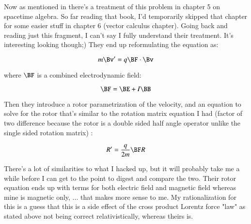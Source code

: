 Now as mentioned in \cite{doran2003gap}
there's a treatment of this problem 
in chapter 5 on spacetime algebra.  So far reading that book, I'd temporarily skipped that chapter for some easier stuff in chapter 6 (vector calculus chapter).  Going back and reading just this fragment, I can't say I fully understand their treatment.  It's interesting looking though;)  They end up reformulating the equation as:

\[
m \Bv' = q \BF \cdot \Bv
\]

where $\BF$ is a combined electrodynamic field:

\[
\BF = \BE + I \BB
\]

Then they introduce a rotor parametrization of the velocity, and an equation to solve for the rotor that's similar to the rotation matrix equation I had (factor of two difference because the rotor is a double sided half angle operator unlike the single sided rotation matrix) :

\[
R' = \frac{q}{2m} \BF R
\]

There's a lot of similarities to what I hacked up, but it will probably take me a while before I can get to the point to digest and compare the two.   Their rotor equation ends up with terms for both electric field and magnetic field whereas mine is magnetic only, ... that makes more sense to me.  My rationalization for this is a guess that this is a side effect of the cross product Lorentz force "law" as stated above not being correct relativistically, whereas theirs is.
